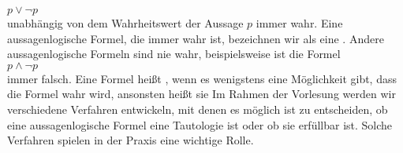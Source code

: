 \hspace*{1.3cm}
$p \vee \neg p$
\\[0.2cm]
unabhängig von dem Wahrheitswert der Aussage $p$ immer wahr.  Eine aussagenlogische
Formel, die immer wahr ist, bezeichnen wir als eine .  Andere
aussagenlogische Formeln sind nie wahr, beispielsweise ist die Formel
\\[0.2cm]
\hspace*{1.3cm}
$p \wedge \neg p$
\\[0.2cm]
immer falsch.  Eine Formel heißt , wenn es wenigstens eine Möglichkeit
gibt, dass die Formel wahr wird, ansonsten heißt sie   Im Rahmen der
Vorlesung werden wir verschiedene Verfahren 
entwickeln, mit denen es möglich ist zu entscheiden, ob eine aussagenlogische Formel eine
Tautologie ist oder ob sie erfüllbar ist.  Solche Verfahren spielen
in der Praxis eine wichtige Rolle.

